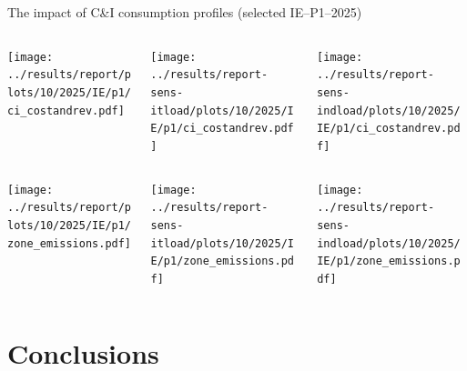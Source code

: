 \begin{frame}{The impact of C\&I consumption profiles (selected IE--P1--2025)}


  {\footnotesize

  \begin{columns}
    \begin{column}{5cm}
    \centering
    \texttt{[image: ../results/report/plots/10/2025/IE/p1/ci\_costandrev.pdf]}
    \end{column}
  
    \begin{column}{5cm}
    \centering
    \texttt{[image: ../results/report-sens-itload/plots/10/2025/IE/p1/ci\_costandrev.pdf]}
    \end{column}
  
    \begin{column}{5cm}
    \centering
    \texttt{[image: ../results/report-sens-indload/plots/10/2025/IE/p1/ci\_costandrev.pdf]}
    \end{column}

  \end{columns}

  \begin{columns}
    \begin{column}{5cm}
    \centering
    \texttt{[image: ../results/report/plots/10/2025/IE/p1/zone\_emissions.pdf]}
    \end{column}
  
    \begin{column}{5cm}
    \centering
    \texttt{[image: ../results/report-sens-itload/plots/10/2025/IE/p1/zone\_emissions.pdf]}
    \end{column}
  
    \begin{column}{5cm}
    \centering
    \texttt{[image: ../results/report-sens-indload/plots/10/2025/IE/p1/zone\_emissions.pdf]}
    \end{column}

  \end{columns}
  }


\end{frame}


\section{Conclusions}

